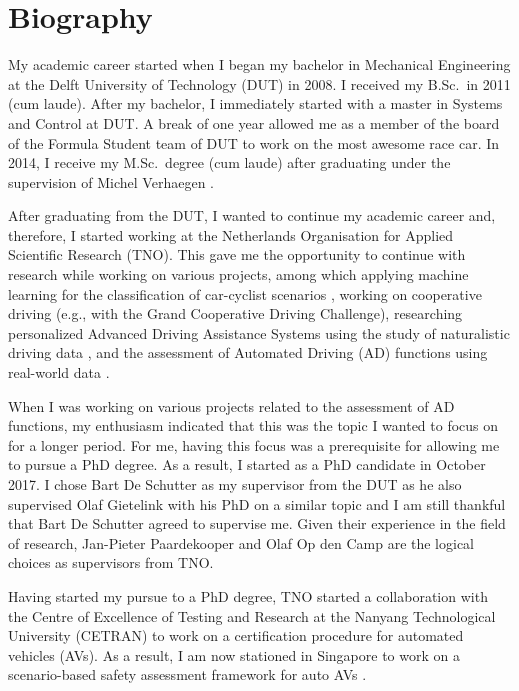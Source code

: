 \section{Biography}
\label{sec:bio}

My academic career started when I began my bachelor in Mechanical Engineering at the Delft University of Technology (DUT) in 2008. I received my B.Sc.\ in 2011 (cum laude). After my bachelor, I immediately started with a master in Systems and Control at DUT. A break of one year allowed me as a member of the board of the Formula Student team of DUT to work on the most awesome race car. In 2014, I receive my M.Sc.\ degree (cum laude) after graduating under the supervision of Michel Verhaegen \cite{deGelder2015sabre}.

After graduating from the DUT, I wanted to continue my academic career and, therefore, I started working at the Netherlands Organisation for Applied Scientific Research (TNO). This gave me the opportunity to continue with research while working on various projects, among which applying machine learning for the classification of car-cyclist scenarios \cite{cara2015carcyclist}, working on cooperative driving (e.g., with the Grand Cooperative Driving Challenge), researching personalized Advanced Driving Assistance Systems using the study of naturalistic driving data \cite{gelder2016pacc}, and the assessment of Automated Driving (AD) functions using real-world data \cite{deGelder2017assessment}.

When I was working on various projects related to the assessment of AD functions, my enthusiasm indicated that this was the topic I wanted to focus on for a longer period. For me, having this focus was a prerequisite for allowing me to pursue a PhD degree. As a result, I started as a PhD candidate in October 2017. I chose Bart De Schutter as my supervisor from the DUT as he also supervised Olaf Gietelink with his PhD on a similar topic \cite{gietelink2007phd} and I am still thankful that Bart De Schutter agreed to supervise me. Given their experience in the field of research, Jan-Pieter Paardekooper and Olaf Op den Camp are the logical choices as supervisors from TNO.

Having started my pursue to a PhD degree, TNO started a collaboration with the Centre of Excellence of Testing and Research at the Nanyang Technological University (CETRAN) to work on a certification procedure for automated vehicles (AVs). As a result, I am now stationed in Singapore to work on a scenario-based safety assessment framework for auto AVs \cite{ploeg2018cetran}.
